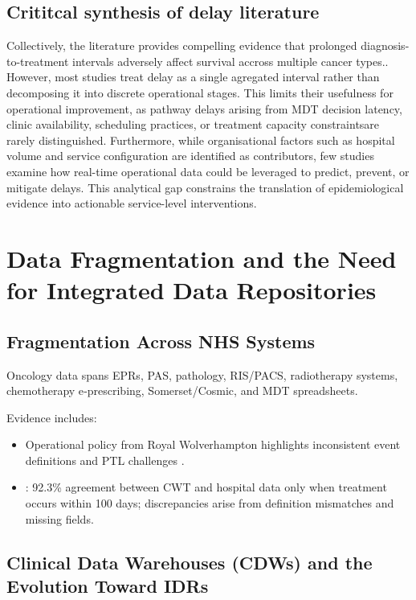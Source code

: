\subsection{Crititcal synthesis of delay literature}
Collectively, the literature provides compelling evidence that prolonged diagnosis-to-treatment intervals adversely affect survival accross multiple cancer types.. However, most studies treat delay as a single agregated interval rather than decomposing it into discrete operational stages. This limits their usefulness for operational improvement, as pathway delays arising from MDT decision latency, clinic availability, scheduling practices, or treatment capacity constraintsare rarely distinguished. Furthermore, while organisational factors such as hospital volume and service configuration are identified as contributors, few studies examine how real-time operational data could be leveraged to predict, prevent, or mitigate delays. This analytical gap constrains the translation of epidemiological evidence into actionable service-level interventions. 

\section{Data Fragmentation and the Need for Integrated Data Repositories}

\subsection{Fragmentation Across NHS Systems}

Oncology data spans EPRs, PAS, pathology, RIS/PACS, radiotherapy systems, chemotherapy e‑prescribing, Somerset/Cosmic, and MDT spreadsheets.

Evidence includes:

\begin{itemize}
    \item Operational policy from Royal Wolverhampton highlights inconsistent event definitions and PTL challenges \citep{theroyalwolverhamptonnhstrust2024}.
    \item \cite{varma2026}: 92.3\% agreement between CWT and hospital data only when treatment occurs within 100 days; discrepancies arise from definition mismatches and missing fields.
\end{itemize}

\subsection{Clinical Data Warehouses (CDWs) and the Evolution Toward IDRs}

